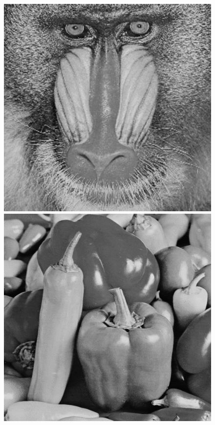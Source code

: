 \begin{figure}[h!]
    \includegraphics[width=\size]{fig/testimages/mandril_gray.png}\hfill
    \includegraphics[width=\size]{fig/testimages/peppers_gray.png}\hfill

\end{figure}
